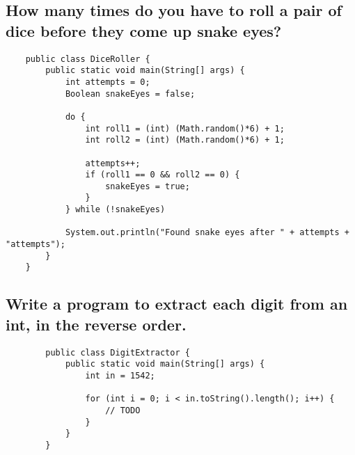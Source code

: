 \documentclass{article}
\begin{document}
    \subsection{How many times do you have to roll a pair of dice before they come up snake eyes?}

    \begin{verbatim}
    public class DiceRoller {
        public static void main(String[] args) {
            int attempts = 0;
            Boolean snakeEyes = false;

            do {
                int roll1 = (int) (Math.random()*6) + 1;
                int roll2 = (int) (Math.random()*6) + 1;

                attempts++;
                if (roll1 == 0 && roll2 == 0) {
                    snakeEyes = true;
                }
            } while (!snakeEyes)
            
            System.out.println("Found snake eyes after " + attempts + "attempts");
        }
    }
    \end{verbatim}

    \subsection{Write a program to extract each digit from an int, in the reverse order.}

    \begin{verbatim}
        public class DigitExtractor {
            public static void main(String[] args) {
                int in = 1542;

                for (int i = 0; i < in.toString().length(); i++) {
                    // TODO
                }
            }
        }
    \end{verbatim}
\end{document}
